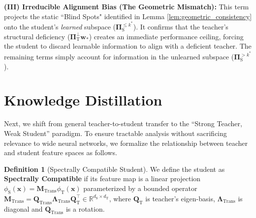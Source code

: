 \documentclass{article}
\theoremstyle{definition}
\newtheorem{definition}{Definition}
\theoremstyle{definition}
\theoremstyle{plain}
\theoremstyle{plain}
\theoremstyle{plain}
\theoremstyle{plain}
\theoremstyle{plain}
\newcommand{\te}{\mathrm{T}}
\newcommand{\st}{\mathrm{S}}
\newcommand{\w}{\mathbf{w}}
\begin{document}

\textbf{(III) Irreducible Alignment Bias (The Geometric Mismatch):} This term projects the static ``Blind Spots" identified in Lemma \ref{lem:geometric_consistency} onto the student's \textit{learned} subspace ($\mathbf{\Pi}_\st^{\le k^*}$). It confirms that the teacher's structural deficiency ($\mathbf{\Pi}_\te^\perp \w_*$) creates an immediate performance ceiling, forcing the student to discard learnable information to align with a deficient teacher. The remaining terms simply account for information in the unlearned subspace ($\mathbf{\Pi}_\st^{> k^*}$).




\section{Knowledge Distillation}
\label{sec:distillation}
Next, we shift from general teacher-to-student transfer to the ``Strong Teacher, Weak Student'' paradigm. To ensure tractable analysis without sacrificing relevance to wide neural networks, we formalize the relationship between teacher and student feature spaces as follows.


\begin{definition}[Spectrally Compatible Student]
\label{def:spectral_alignment}
We define the student as \textbf{Spectrally Compatible} if its feature map is a linear projection $\phi_{\st}(\mathbf{x}) = \mathbf{M}_\text{Trans} \phi_{\te}(\mathbf{x})$ parameterized by a bounded operator $\mathbf{M}_\text{Trans}= \mathbf{Q}_\text{Trans} \mathbf{\Lambda}_{\mathrm{Trans}} \mathbf{Q}_\te^\top \in \mathbb{R}^{d_\st \times d_\te}$, where $\mathbf{Q}_\te$ is teacher's eigen-basis, $\mathbf{\Lambda}_{\mathrm{Trans}}$ is diagonal and $\mathbf{Q}_\text{Trans}$ is a rotation.
\end{definition}
\end{document}
